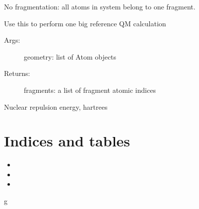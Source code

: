 \documentclass[letterpaper,10pt,english]{sphinxmanual}
\begin{document}

\begin{fulllineitems}
\label{\detokenize{globals:globals.geom.makefrag_full_system}}
No fragmentation: all atoms in system belong to one fragment.

Use this to perform one big reference QM calculation
\begin{description}
\item[{Args:}] \leavevmode
geometry: list of Atom objects

\item[{Returns:}] \leavevmode
fragments: a list of fragment atomic indices

\end{description}

\end{fulllineitems}


\begin{fulllineitems}
\label{\detokenize{globals:globals.geom.nuclear_repulsion_energy}}
Nuclear repulsion energy, hartrees

\end{fulllineitems}



\chapter{Indices and tables}
\label{\detokenize{index:indices-and-tables}}\begin{itemize}
\item {} 

\item {} 

\item {} 

\end{itemize}


\renewcommand{\indexname}{Python Module Index}
\begin{sphinxtheindex}
\def\bigletter#1{{\Large\sffamily#1}\nopagebreak\vspace{1mm}}
\bigletter{g}
\item {}
\end{sphinxtheindex}

\renewcommand{\indexname}{Index}
\printindex
\end{document}
